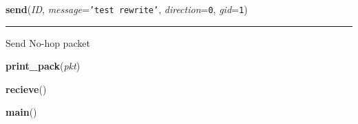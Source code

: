     \vspace{0.5ex}

\hspace{.8\funcindent}\begin{boxedminipage}{\funcwidth}

    \raggedright \textbf{send}(\textit{ID}, \textit{message}={\tt \texttt{'}\texttt{test rewrite}\texttt{'}}, \textit{direction}={\tt 0}, \textit{gid}={\tt 1})

    \vspace{-1.5ex}

    \rule{\textwidth}{0.5\fboxrule}
\setlength{\parskip}{2ex}
    Send No-hop packet

\setlength{\parskip}{1ex}
    \end{boxedminipage}

    \label{send_and_recieve_dht:print_pack}

    \vspace{0.5ex}

\hspace{.8\funcindent}\begin{boxedminipage}{\funcwidth}

    \raggedright \textbf{print\_pack}(\textit{pkt})

\setlength{\parskip}{2ex}
\setlength{\parskip}{1ex}
    \end{boxedminipage}

    \label{send_and_recieve_dht:recieve}

    \vspace{0.5ex}

\hspace{.8\funcindent}\begin{boxedminipage}{\funcwidth}

    \raggedright \textbf{recieve}()

\setlength{\parskip}{2ex}
\setlength{\parskip}{1ex}
    \end{boxedminipage}

    \label{send_and_recieve_dht:main}

    \vspace{0.5ex}

\hspace{.8\funcindent}\begin{boxedminipage}{\funcwidth}

    \raggedright \textbf{main}()

\setlength{\parskip}{2ex}
\setlength{\parskip}{1ex}
    \end{boxedminipage}


